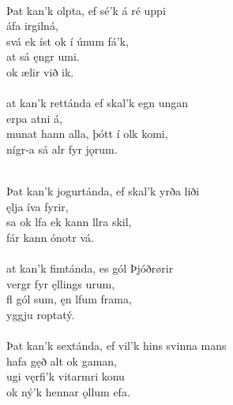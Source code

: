  \\

\bva Þat kan'k olpta, \hld ef sé'k á ré uppi \\%
\ind {}áfa irgilná, \\%
svá ek íst \hld ok í únum fá'k, \\%
\ind at sá ęngr umi. \\%
\ind ok ælir við ik.\\%

 \\

\bva {}at kan'k rettánda \hld ef skal'k egn ungan \\%
\ind {}erpa atni á,\footnotemark[49] \\%
munat hann alla, \hld þótt í olk komi, \\%
\ind {}nígr-a sá alr fyr jǫrum.\\%

 \\

\bva Þat kan'k jogurtánda, \hld ef skal'k yrða liði \\%
\ind {}ęlja íva fyrir, \\%
sa ok lfa \hld ek kann llra skil, \\%
\ind fár kann ónotr vá.\\%

 \\

\bva {}at kan'k fimtánda, \hld es gól {Þ}jóðrørir \\%
\ind {}vergr fyr ęllings urum, \\%
fl gól sum, \hld ęn lfum frama, \\%
\ind {}yggju roptatý.\\%

 \\

\bva Þat kan'k sextánda, \hld ef vil'k hins svinna mans \\%
\ind hafa gęð alt ok gaman, \\%
ugi vęrfi'k \hld {}vitarmri konu \\%
\ind ok ný'k hennar ǫllum efa.\\%

